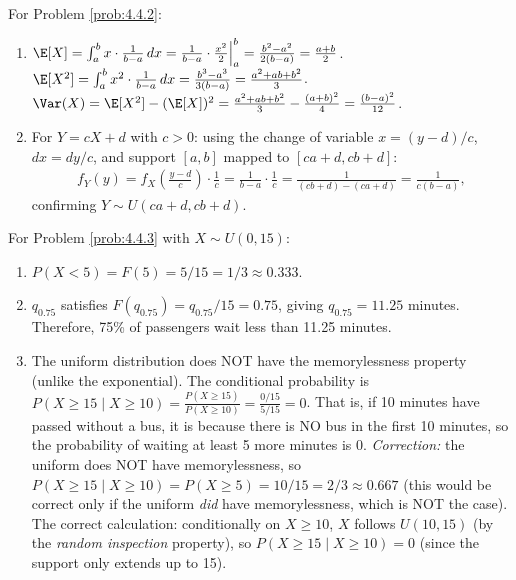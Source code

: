 \begin{solucion}
	\label{sol:4.4.2}
	For Problem \ref{prob:4.4.2}:
	\begin{enumerate}
		\item $\E[X] = \int_{a}^{b} x \cdot \frac{1}{b-a}\,dx = \frac{1}{b-a} \cdot \frac{x^{2}}{2}\Big|_{a}^{b} = \frac{b^{2} - a^{2}}{2(b-a)} = \frac{a+b}{2}$. $\E[X^{2}] = \int_{a}^{b} x^{2} \cdot \frac{1}{b-a}\,dx = \frac{b^{3} - a^{3}}{3(b-a)} = \frac{a^{2} + ab + b^{2}}{3}$. $\Var(X) = \E[X^{2}] - (\E[X])^{2} = \frac{a^{2} + ab + b^{2}}{3} - \frac{(a+b)^{2}}{4} = \frac{(b-a)^{2}}{12}$.
		\item For $Y = cX + d$ with $c > 0$: using the change of variable $x = (y-d)/c$, $dx = dy/c$, and support $[a, b]$ mapped to $[ca+d, cb+d]$:
		\begin{align*}
			f_{Y}(y) = f_{X}\left(\frac{y-d}{c}\right) \cdot \frac{1}{c} = \frac{1}{b-a} \cdot \frac{1}{c} = \frac{1}{(cb+d) - (ca+d)} = \frac{1}{c(b-a)},
		\end{align*}
		confirming $Y \sim U(ca+d, cb+d)$.
	\end{enumerate}
\end{solucion}

\begin{solucion}
	\label{sol:4.4.3}
	For Problem \ref{prob:4.4.3} with $X \sim U(0, 15)$:
	\begin{enumerate}
		\item $P(X < 5) = F(5) = 5/15 = 1/3 \approx 0.333$.
		\item $q_{0.75}$ satisfies $F(q_{0.75}) = q_{0.75}/15 = 0.75$, giving $q_{0.75} = 11.25$ minutes. Therefore, 75\% of passengers wait less than 11.25 minutes.
		\item The uniform distribution does NOT have the memorylessness property (unlike the exponential). The conditional probability is $P(X \ge 15 \mid X \ge 10) = \frac{P(X \ge 15)}{P(X \ge 10)} = \frac{0/15}{5/15} = 0$. That is, if 10 minutes have passed without a bus, it is because there is NO bus in the first 10 minutes, so the probability of waiting at least 5 more minutes is 0. \emph{Correction:} the uniform does NOT have memorylessness, so $P(X \ge 15 \mid X \ge 10) = P(X \ge 5) = 10/15 = 2/3 \approx 0.667$ (this would be correct only if the uniform \emph{did} have memorylessness, which is NOT the case). The correct calculation: conditionally on $X \ge 10$, $X$ follows $U(10, 15)$ (by the \emph{random inspection} property), so $P(X \ge 15 \mid X \ge 10) = 0$ (since the support only extends up to 15).
	\end{enumerate}
\end{solucion}

